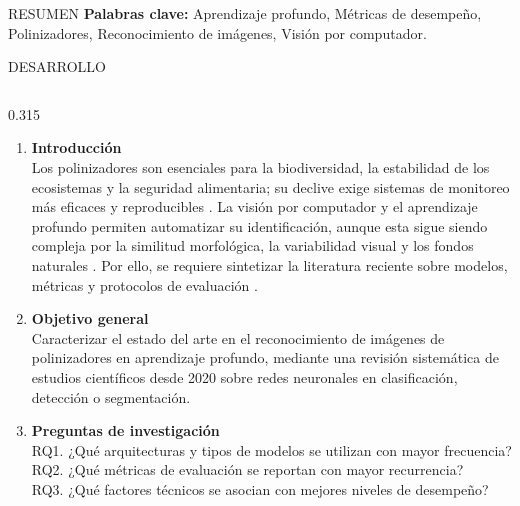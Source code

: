 \documentclass[final,t]{beamer}
\begin{document}
\begin{frame}[t]
\begin{block}{RESUMEN}
\vspace{0.3cm}
\textbf{Palabras clave:} Aprendizaje profundo, Métricas de desempeño, Polinizadores, Reconocimiento de imágenes, Visión por computador.
\end{block}

\vspace{0.5cm}

\begin{block}{DESARROLLO}

\vspace{-1.5cm}
\begin{columns}[T]

\begin{column}{0.315\linewidth}

\begin{enumerate}

\item \textbf{Introducción}\\[0.2cm]
\justifying
Los polinizadores son esenciales para la biodiversidad, la estabilidad de los ecosistemas y la seguridad alimentaria; su declive exige sistemas de monitoreo más eficaces y reproducibles \parencite{ghosh2025pollinator,hellwig2024pollinator}. La visión por computador y el aprendizaje profundo permiten automatizar su identificación, aunque esta sigue siendo compleja por la similitud morfológica, la variabilidad visual y los fondos naturales \parencite{hoye2021entomology,spiesman2021bumblebee,calisan2025evaluation}. Por ello, se requiere sintetizar la literatura reciente sobre modelos, métricas y protocolos de evaluación \parencite{nizam2020segmentation}.


\vspace{0.5cm}
\item \textbf{Objetivo general}\\[0.2cm]

Caracterizar el estado del arte en el reconocimiento de imágenes de polinizadores en aprendizaje profundo, mediante una revisión sistemática de estudios científicos desde 2020 sobre redes neuronales en clasificación, detección o segmentación.


\vspace{0.5cm}
\item \textbf{Preguntas de investigación}\\[0.2cm]
RQ1. ¿Qué arquitecturas y tipos de modelos se utilizan con mayor frecuencia?\\
RQ2. ¿Qué métricas de evaluación se reportan con mayor recurrencia?\\
RQ3. ¿Qué factores técnicos se asocian con mejores niveles de desempeño?


\end{enumerate}
\end{column}
\end{columns}
\end{block}
\end{frame}
\end{document}
